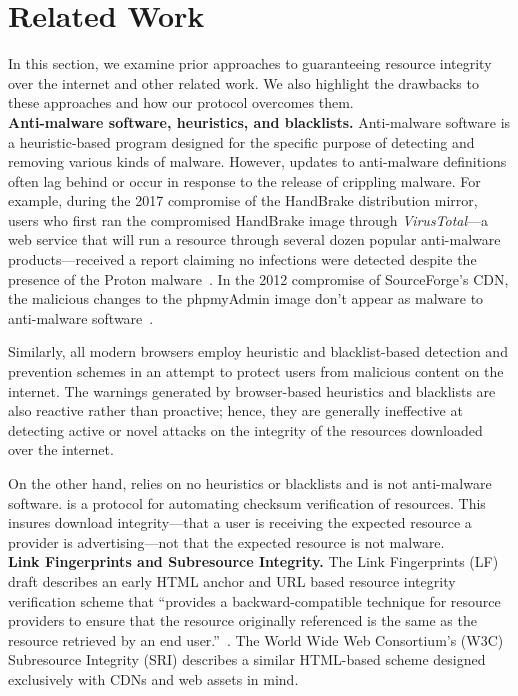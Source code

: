 \section{Related Work} \label{sec:related}

In this section, we examine prior approaches to guaranteeing resource integrity
over the internet and other related work. We also highlight the drawbacks to
these approaches and how our protocol overcomes them. \\

\noindent\textbf{Anti-malware software, heuristics, and blacklists.}
Anti-malware software is a heuristic-based program designed for the specific
purpose of detecting and removing various kinds of malware. However, updates to
anti-malware definitions often lag behind or occur in response to the release of
crippling malware. For example, during the 2017 compromise of the HandBrake
distribution mirror, users who first ran the compromised HandBrake image through
\textit{VirusTotal}---a web service that will run a resource through several
dozen popular anti-malware products---received a report claiming no infections
were detected despite the presence of the Proton malware~\cite{SCA-HB1}. In the
2012 compromise of SourceForge's CDN, the malicious changes to the phpmyAdmin
image don't appear as malware to anti-malware software~\cite{SCA-PMA1}.

Similarly, all modern browsers employ heuristic and blacklist-based detection
and prevention schemes in an attempt to protect users from malicious content on
the internet. The warnings generated by browser-based heuristics and blacklists
are also reactive rather than proactive; hence, they are generally ineffective
at detecting active or novel attacks on the integrity of the resources
downloaded over the internet.

On the other hand, \SYSTEM{} relies on no heuristics or blacklists and is not
anti-malware software. \SYSTEM{} is a protocol for automating checksum
verification of resources. This insures download integrity---that a user is
receiving the expected resource a provider is advertising---not that the
expected resource is not malware. \\

\noindent\textbf{Link Fingerprints and Subresource Integrity.} The Link
Fingerprints (LF) draft describes an early HTML anchor and URL based resource
integrity verification scheme that ``provides a backward-compatible technique
for resource providers to ensure that the resource originally referenced is the
same as the resource retrieved by an end user.''~\cite{LF}. The World Wide Web
Consortium's (W3C) Subresource Integrity (SRI) describes a similar HTML-based
scheme designed exclusively with CDNs and web assets in mind.

